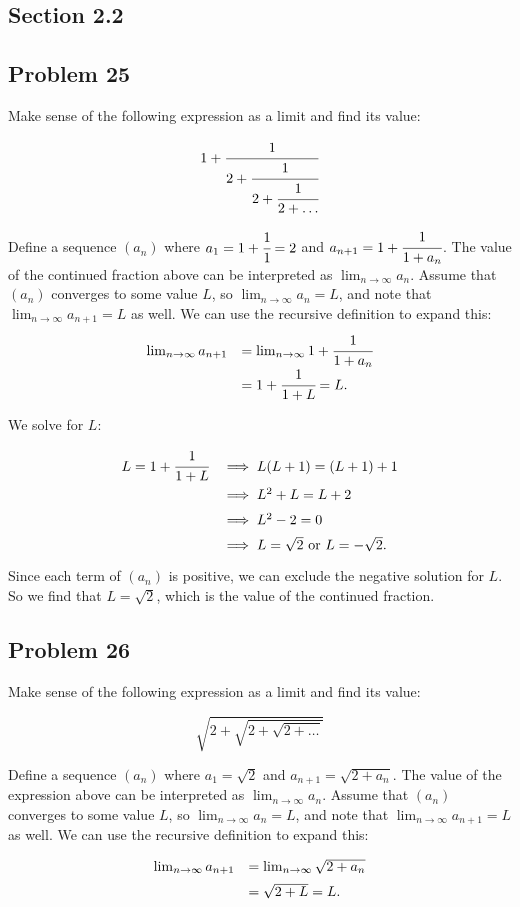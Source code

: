 \documentclass[11pt]{article}
\begin{document}
\subsection*{Section 2.2}
\subsection*{Problem 25}
Make sense of the following expression as a limit and find its value:

\[ 1+\cfrac{1}{2+\cfrac{1}{2+\cfrac{1}{2+\ldots}}} \]

Define a sequence $(a_n)$ where $a_1=1+\cfrac{1}{1}=2$ and
$a_{n+1} = 1+\cfrac{1}{1+a_n}$. The value of the continued fraction above can
be interpreted as $\lim_{n\to\infty}a_n$. Assume that $(a_n)$ converges to some
value $L$, so $\lim_{n\to\infty}a_n=L$, and note that
$\lim_{n\to\infty}a_{n+1}=L$ as well. We can use the recursive definition to
expand this:
\[
\def\arraystretch{1.5}
\begin{array}{rl}
\lim_{n\to\infty}a_{n+1} &= \lim_{n\to\infty}1+\cfrac{1}{1+a_n} \\
&= 1+\cfrac{1}{1+L} = L.
\end{array}
\]

We solve for $L$:

\[
\def\arraystretch{1.5}
\begin{array}{rl}
L = 1+\cfrac{1}{1+L} &\implies L(L+1) = (L+1)+1 \\
&\implies L^2+L=L+2 \\
&\implies L^2-2=0 \\
&\implies L=\sqrt{2} \textrm{ or } L=-\sqrt{2}.
\end{array}
\]
Since each term of $(a_n)$ is positive, we can exclude the negative solution
for $L$. So we find that $L=\sqrt{2}$, which is the value of the continued fraction.
\subsection*{Problem 26}
Make sense of the following expression as a limit and find its value:

\[ \sqrt{2+\sqrt{2+\sqrt{2+\ldots}}} \]

Define a sequence $(a_n)$ where $a_1=\sqrt{2}$ and
$a_{n+1} = \sqrt{2+a_n}$. The value of the expression above can
be interpreted as $\lim_{n\to\infty}a_n$. Assume that $(a_n)$ converges to some
value $L$, so $\lim_{n\to\infty}a_n=L$, and note that
$\lim_{n\to\infty}a_{n+1}=L$ as well. We can use the recursive definition to
expand this:
\[
\def\arraystretch{1.5}
\begin{array}{rl}
\lim_{n\to\infty}a_{n+1} &= \lim_{n\to\infty}\sqrt{2+a_n} \\
&= \sqrt{2+L} = L.
\end{array}
\]
\end{document}

